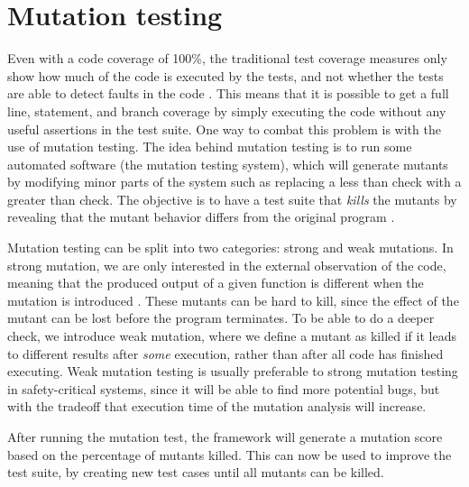 \section{Mutation testing}
Even with a code coverage of 100\%, the traditional test coverage measures only show how much of the code is executed by the tests, and not whether the tests are able to detect faults in the code \cite{pitest}.
This means that it is possible to get a full line, statement, and branch coverage by simply executing the code without any useful assertions in the test suite.
One way to combat this problem is with the use of mutation testing.
The idea behind mutation testing is to run some automated software (the mutation testing system), which will generate mutants by modifying minor parts of the system such as replacing a less than check with a greater than check.
The objective is to have a test suite that \textit{kills} the mutants by revealing that the mutant behavior differs from the original program \cite{mutationtesting}.

Mutation testing can be split into two categories: strong and weak mutations.
In strong mutation, we are only interested in the external observation of the code, meaning that the produced output of a given function is different when the mutation is introduced \cite{mutationtesting}.
These mutants can be hard to kill, since the effect of the mutant can be lost before the program terminates.
To be able to do a deeper check, we introduce weak mutation, where we define a mutant as killed if it leads to different results after \textit{some} execution, rather than after all code has finished executing.
Weak mutation testing is usually preferable to strong mutation testing in safety-critical systems, since it will be able to find more potential bugs, but with the tradeoff that execution time of the mutation analysis will increase.

After running the mutation test, the framework will generate a mutation score based on the percentage of mutants killed.
This can now be used to improve the test suite, by creating new test cases until all mutants can be killed.
